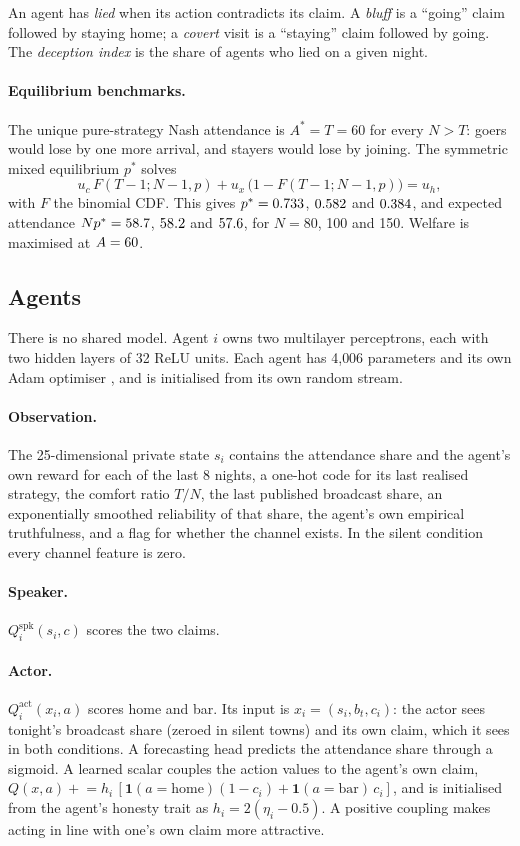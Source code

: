 \documentclass[11pt]{article}
\begin{document}
An agent has \emph{lied} when its action contradicts its claim. A \emph{bluff} is a ``going'' claim followed by staying home; a \emph{covert} visit is a ``staying'' claim followed by going. The \emph{deception index} is the share of agents who lied on a given night.

\paragraph{Equilibrium benchmarks.}
The unique pure-strategy Nash attendance is $A^* = T = 60$ for every $N > T$: goers would lose by one more arrival, and stayers would lose by joining. The symmetric mixed equilibrium $p^*$ solves
\begin{equation}
u_c\,F(T-1; N-1, p) + u_x\,\bigl(1 - F(T-1; N-1, p)\bigr) = u_h,
\end{equation}
with $F$ the binomial CDF. This gives $p^* = 0.733$, $0.582$ and $0.384$, and expected attendance $Np^* = 58.7$, $58.2$ and $57.6$, for $N = 80$, 100 and 150. Welfare is maximised at $A = 60$.

\subsection{Agents}

There is no shared model. Agent $i$ owns two multilayer perceptrons, each with two hidden layers of 32 ReLU units. Each agent has 4{,}006 parameters and its own Adam optimiser \citep{kingma2015}, and is initialised from its own random stream.

\paragraph{Observation.} The 25-dimensional private state $s_i$ contains the attendance share and the agent's own reward for each of the last 8 nights, a one-hot code for its last realised strategy, the comfort ratio $T/N$, the last published broadcast share, an exponentially smoothed reliability of that share, the agent's own empirical truthfulness, and a flag for whether the channel exists. In the silent condition every channel feature is zero.

\paragraph{Speaker.} $Q^{\text{spk}}_i(s_i, c)$ scores the two claims.

\paragraph{Actor.} $Q^{\text{act}}_i(x_i, a)$ scores home and bar. Its input is $x_i = (s_i, b_t, c_i)$: the actor sees tonight's broadcast share (zeroed in silent towns) and its own claim, which it sees in both conditions. A forecasting head predicts the attendance share through a sigmoid. A learned scalar couples the action values to the agent's own claim, $Q(x, a) \mathrel{+}= h_i\,[\mathbf{1}(a = \text{home})(1 - c_i) + \mathbf{1}(a = \text{bar})\,c_i]$, and is initialised from the agent's honesty trait as $h_i = 2(\eta_i - 0.5)$. A positive coupling makes acting in line with one's own claim more attractive.
\end{document}
